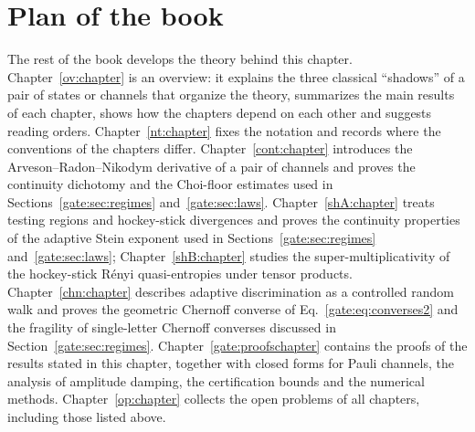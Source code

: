 \section{Plan of the book}\label{gate:sec:plan}
The rest of the book develops the theory behind this chapter. Chapter~\ref{ov:chapter} is an overview: it explains the three classical ``shadows'' of a pair of states or channels that organize the theory, summarizes the main results of each chapter, shows how the chapters depend on each other and suggests reading orders. Chapter~\ref{nt:chapter} fixes the notation and records where the conventions of the chapters differ. Chapter~\ref{cont:chapter} introduces the Arveson--Radon--Nikodym derivative of a pair of channels and proves the continuity dichotomy and the Choi-floor estimates used in Sections~\ref{gate:sec:regimes} and~\ref{gate:sec:laws}. Chapter~\ref{shA:chapter} treats testing regions and hockey-stick divergences and proves the continuity properties of the adaptive Stein exponent used in Sections~\ref{gate:sec:regimes} and~\ref{gate:sec:laws}; Chapter~\ref{shB:chapter} studies the super-multiplicativity of the hockey-stick R\'enyi quasi-entropies under tensor products. Chapter~\ref{chn:chapter} describes adaptive discrimination as a controlled random walk and proves the geometric Chernoff converse of Eq.~\eqref{gate:eq:converses2} and the fragility of single-letter Chernoff converses discussed in Section~\ref{gate:sec:regimes}. Chapter~\ref{gate:proofschapter} contains the proofs of the results stated in this chapter, together with closed forms for Pauli channels, the analysis of amplitude damping, the certification bounds and the numerical methods. Chapter~\ref{op:chapter} collects the open problems of all chapters, including those listed above.

\endgroup
